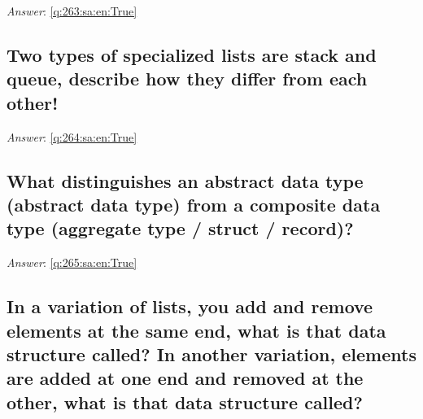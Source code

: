 \documentclass[a4paper,11pt,oneside]{article}
\begin{document}
\begin{sloppypar}
\label{q:263:sa:en:False}

\vspace{2cm}

\noindent\makebox[\textwidth]{\hrulefill}

\vspace{1cm}

\textit{Answer}: \autoref{q:263:sa:en:True}



\subsection{Two types of specialized lists are stack and queue, describe how they differ from each other!}

\label{q:264:sa:en:False}

\vspace{2cm}

\noindent\makebox[\textwidth]{\hrulefill}

\vspace{1cm}

\textit{Answer}: \autoref{q:264:sa:en:True}



\subsection{What distinguishes an abstract data type (abstract data type) from a composite data type (aggregate type / struct / record)?}

\label{q:265:sa:en:False}

\vspace{2cm}

\noindent\makebox[\textwidth]{\hrulefill}

\vspace{1cm}

\textit{Answer}: \autoref{q:265:sa:en:True}



\subsection{In a variation of lists, you add and remove elements at the same end, what is that data structure called? In another variation, elements are added at one end and removed at the other, what is that data structure called?}

\label{q:266:sa:en:False}

\vspace{2cm}


\end{sloppypar}
\end{document}
